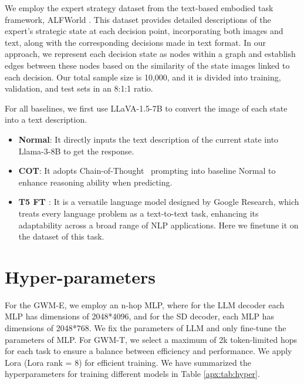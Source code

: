  We employ the expert strategy dataset from the text-based embodied task framework, ALFWorld \citep{shridhar2020alfworld,yang2024embodied}. This dataset provides detailed descriptions of the expert's strategic state at each decision point, incorporating both images and text, along with the corresponding decisions made in text format. In our approach, we represent each decision state as nodes within a graph and establish edges between these nodes based on the similarity of the state images linked to each decision. Our total sample size is 10,000, and it is divided into training, validation, and test sets in an 8:1:1 ratio.

 For all baselines, we first use LLaVA-1.5-7B to convert the image of each state into a text description. 

 \begin{itemize}[leftmargin=1em, itemsep=0pt] 
 \item \textbf{Normal}: It directly inputs the text description of the current state into Llama-3-8B to get the response.  
 
\item  \textbf{COT}: It adopts Chain-of-Thought~\cite{wei2022chain} prompting into baseline Normal to enhance reasoning ability when predicting.

\item \textbf{T5 FT \citep{raffel2020exploring}}:  It is a versatile language model designed by Google Research, which treats every language problem as a text-to-text task, enhancing its adaptability across a broad range of NLP applications. Here we finetune it on the dataset of this task.

 \end{itemize}




\section{Hyper-parameters} \label{sec:hyper}

For the GWM-E, we employ an n-hop MLP, where for the LLM decoder each MLP has dimensions of 2048*4096, and for the SD decoder, each MLP has dimensions of 2048*768. We fix the parameters of LLM and only fine-tune the parameters of MLP. For GWM-T, we select a maximum of 2k token-limited hops for each task to ensure a balance between efficiency and performance. We apply Lora (Lora rank = 8) \citep{hu2021lora} for efficient training. We have summarized the hyperparameters for training different models in Table \ref{apx:tab:hyper}.



